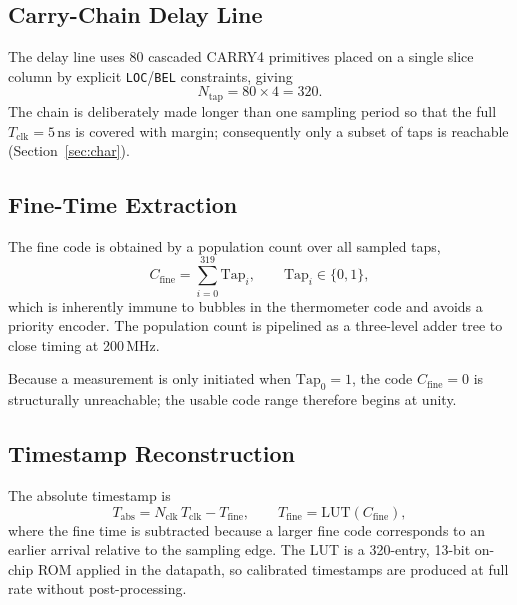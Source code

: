 \documentclass[journal]{IEEEtran}
\begin{document}
\subsection{Carry-Chain Delay Line}

The delay line uses 80 cascaded CARRY4 primitives placed on a single slice
column by explicit \texttt{LOC}/\texttt{BEL} constraints, giving
\begin{equation}
N_{\mathrm{tap}} = 80 \times 4 = 320 .
\end{equation}
The chain is deliberately made longer than one sampling period so that the
full $T_{\mathrm{clk}}=5$\,ns is covered with margin; consequently only a
subset of taps is reachable (Section~\ref{sec:char}).

\subsection{Fine-Time Extraction}

The fine code is obtained by a population count over all sampled taps,
\begin{equation}
C_{\mathrm{fine}} = \sum_{i=0}^{319} \mathrm{Tap}_i ,
\qquad \mathrm{Tap}_i \in \{0,1\},
\end{equation}
which is inherently immune to bubbles in the thermometer code and avoids a
priority encoder. The population count is pipelined as a three-level adder
tree to close timing at 200\,MHz.

Because a measurement is only initiated when $\mathrm{Tap}_0=1$, the code
$C_{\mathrm{fine}}=0$ is structurally unreachable; the usable code range
therefore begins at unity.

\subsection{Timestamp Reconstruction}

The absolute timestamp is
\begin{equation}
T_{\mathrm{abs}} = N_{\mathrm{clk}}\,T_{\mathrm{clk}} - T_{\mathrm{fine}},
\qquad
T_{\mathrm{fine}} = \mathrm{LUT}\!\left(C_{\mathrm{fine}}\right),
\end{equation}
where the fine time is subtracted because a larger fine code corresponds to an
earlier arrival relative to the sampling edge. The LUT is a 320-entry,
13-bit on-chip ROM applied in the datapath, so calibrated timestamps are
produced at full rate without post-processing.

\end{document}
